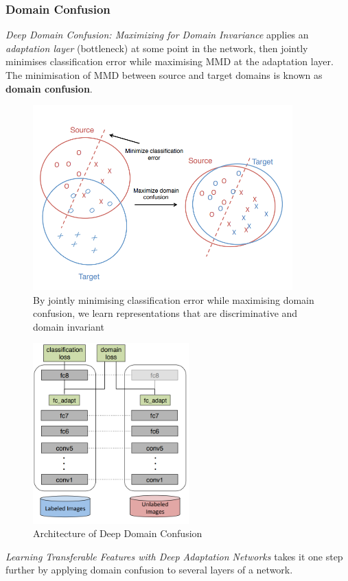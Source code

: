 \documentclass{report}
\begin{document}
\subsubsection{Domain Confusion}
\textit{Deep Domain Confusion: Maximizing for Domain Invariance}\parencite{deepdomainconfusion} applies an \textit{adaptation layer} (bottleneck) at some point in the network, then jointly minimises classification error while maximising MMD at the adaptation layer. The minimisation of MMD between source and target domains is known as \textbf{domain confusion}.
\begin{figure}[h]
	\centering
	\includegraphics[width=10cm]{domainconfusion}
	\caption{By jointly minimising classification error while maximising domain confusion, we learn representations that are discriminative and domain invariant}
	\label{fig:domainconfusion}
\end{figure}
\begin{figure}[h]
	\centering
	\includegraphics[width=6cm]{imgs/domainconfusion2}
	\caption{Architecture of Deep Domain Confusion\parencite{deepdomainconfusion}}
	\label{fig:domainconfusion2}
\end{figure}
\textit{Learning Transferable Features with Deep Adaptation Networks}\parencite{learningtransferabledeepadaptation} takes it one step further by applying domain confusion to several layers of a network.
\end{document}
